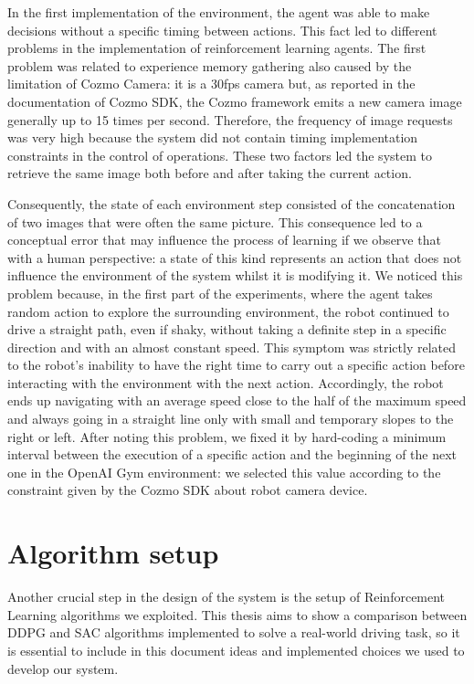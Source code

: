 In the first implementation of the environment, the agent was able to make decisions without a specific timing between actions.
This fact led to different problems in the implementation of reinforcement learning agents.
The first problem was related to experience memory gathering also caused by the limitation of Cozmo Camera: it is a 30fps camera but, as reported in the documentation of Cozmo SDK, the Cozmo framework emits a new camera image generally up to 15 times per second.
Therefore, the frequency of image requests was very high because the system did not contain timing implementation constraints in the control of operations.
These two factors led the system to retrieve the same image both before and after taking the current action.

Consequently, the state of each environment step consisted of the concatenation of two images that were often the same picture.
This consequence led to a conceptual error that may influence the process of learning if we observe that with a human perspective: a state of this kind represents an action that does not influence the environment of the system whilst it is modifying it.
We noticed this problem because, in the first part of the experiments, where the agent takes random action to explore the surrounding environment, the robot continued to drive a straight path, even if shaky, without taking a definite step in a specific direction and with an almost constant speed.
This symptom was strictly related to the robot's inability to have the right time to carry out a specific action before interacting with the environment with the next action.
Accordingly, the robot ends up navigating with an average speed close to the half of the maximum speed and always going in a straight line only with small and temporary slopes to the right or left.
After noting this problem, we fixed it by hard-coding a minimum interval between the execution of a specific action and the beginning of the next one in the OpenAI Gym environment: we selected this value according to the constraint given by the Cozmo SDK about robot camera device.

\section{Algorithm setup}

Another crucial step in the design of the system is the setup of Reinforcement Learning algorithms we exploited.
This thesis aims to show a comparison between DDPG and SAC algorithms implemented to solve a real-world driving task, so it is essential to include in this document ideas and implemented choices we used to develop our system.

